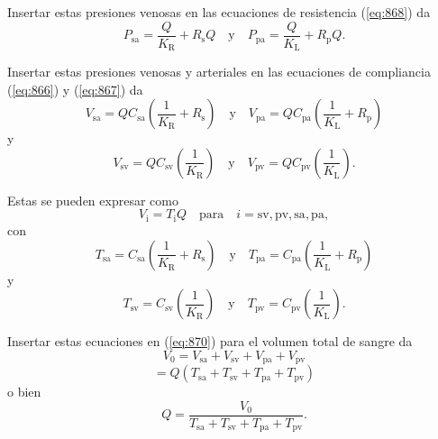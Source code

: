 \documentclass[12pt]{book}
\begin{document}
Insertar estas presiones venosas en las ecuaciones de resistencia (\ref{eq:868}) da
\begin{equation}
P_{\text{sa}} = \frac{Q}{K_{\text{R}}} + R_{\text{s}} Q \quad \text{y} \quad P_{\text{pa}} = \frac{Q}{K_{\text{L}}} + R_{\text{p}} Q.
\label{eq:872}
\end{equation}

Insertar estas presiones venosas y arteriales en las ecuaciones de compliancia (\ref{eq:866}) y (\ref{eq:867}) da
\begin{equation}
V_{\text{sa}} = Q C_{\text{sa}} \left( \frac{1}{K_{\text{R}}} + R_{\text{s}} \right) \quad \text{y} \quad V_{\text{pa}} = Q C_{\text{pa}} \left( \frac{1}{K_{\text{L}}} + R_{\text{p}} \right)
\label{eq:873}
\end{equation}
y
\begin{equation}
V_{\text{sv}} = Q C_{\text{sv}} \left( \frac{1}{K_{\text{R}}} \right) \quad \text{y} \quad V_{\text{pv}} = Q C_{\text{pv}} \left( \frac{1}{K_{\text{L}}} \right).
\label{eq:874}
\end{equation}

Estas se pueden expresar como
\begin{equation}
V_{\text{i}} = T_{\text{i}} Q \quad \text{para} \quad i = \text{sv}, \text{pv}, \text{sa}, \text{pa},
\label{eq:875}
\end{equation}
con
\begin{equation}
T_{\text{sa}} = C_{\text{sa}} \left( \frac{1}{K_{\text{R}}} + R_{\text{s}} \right) \quad \text{y} \quad T_{\text{pa}} = C_{\text{pa}} \left( \frac{1}{K_{\text{L}}} + R_{\text{p}} \right)
\label{eq:876}
\end{equation}
y
\begin{equation}
T_{\text{sv}} = C_{\text{sv}} \left( \frac{1}{K_{\text{R}}} \right) \quad \text{y} \quad T_{\text{pv}} = C_{\text{pv}} \left( \frac{1}{K_{\text{L}}} \right).
\label{eq:877}
\end{equation}

Insertar estas ecuaciones en (\ref{eq:870}) para el volumen total de sangre da
\begin{equation}
V_0 = V_{\text{sa}} + V_{\text{sv}} + V_{\text{pa}} + V_{\text{pv}}
\label{eq:878}
\end{equation}
\begin{equation}
= Q(T_{\text{sa}} + T_{\text{sv}} + T_{\text{pa}} + T_{\text{pv}})
\label{eq:879}
\end{equation}
o bien
\begin{equation}
Q = \frac{V_0}{T_{\text{sa}} + T_{\text{sv}} + T_{\text{pa}} + T_{\text{pv}}}.
\label{eq:880}
\end{equation}
\end{document}

